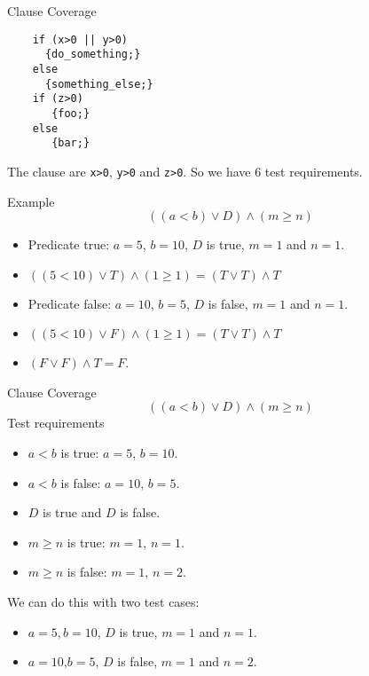 \documentclass{beamer}
\begin{document}
\begin{frame}[fragile]{Clause Coverage}
  \begin{lstlisting}
    if (x>0 || y>0) 
      {do_something;} 
    else
      {something_else;}
    if (z>0) 
       {foo;}
    else
       {bar;}
  \end{lstlisting}
The clause are \verb+x>0+, \verb+y>0+ and  \verb+z>0+.  So we have 6
test requirements. 
\end{frame}
\begin{frame}{Example}
\[
((a<b) \lor D) \land (m \geq n)
\]
\begin{itemize}
\item Predicate true: $a=5$, $b=10$, $D$ is true, $m=1$ and $n=1$.
\item $((5<10) \lor T) \land (1 \geq 1) = (T \lor T )\land T$
\end{itemize}

\begin{itemize}
\item Predicate false: $a=10$, $b=5$, $D$ is false, $m=1$ and $n=1$.
\item $((5<10) \lor F) \land (1 \geq 1) = (T \lor T )\land T$
\item $(F \lor F) \land T = F$.
\end{itemize}

\end{frame}
\begin{frame}{Clause Coverage}
\[
((a<b) \lor D) \land (m \geq n)
\]
Test requirements 
\begin{itemize}
\item $a<b$ is true: $a=5$, $b=10$.
\item $a<b$ is false: $a=10$, $b=5$.
\item $D$ is true and $D$ is false.
\item $m\geq n$ is true: $m=1$, $n=1$.
\item $m\geq n$ is false: $m=1$, $n=2$.
\end{itemize}
We can do this with two test cases:
\begin{itemize}
\item $a=5, b=10$, $D$ is true, $m=1$ and $n=1$. 
\item $a=10$,$b=5$, $D$ is false, $m=1$ and $n=2$.
\end{itemize}
  
\end{frame}
\end{document}
